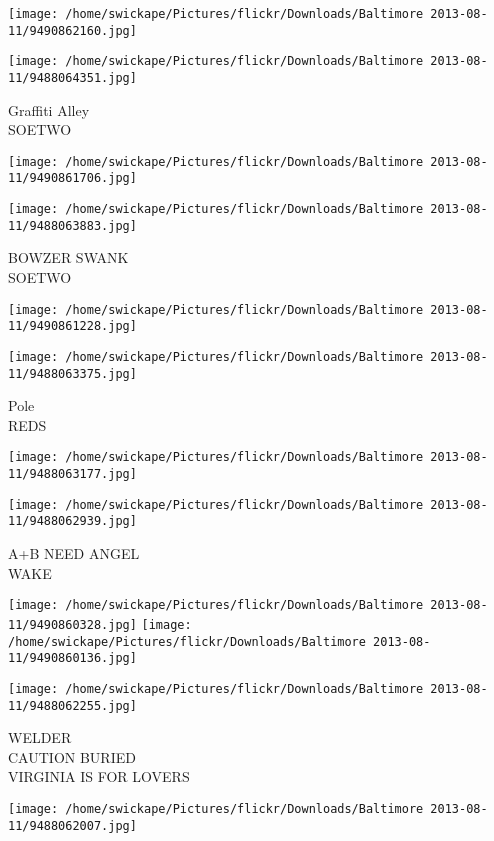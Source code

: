 \documentclass[10pt,letterpaper]{article}
\begin{document}
\texttt{[image: /home/swickape/Pictures/flickr/Downloads/Baltimore 2013-08-11/9490862160.jpg]}

\vspace{0.25in}
\texttt{[image: /home/swickape/Pictures/flickr/Downloads/Baltimore 2013-08-11/9488064351.jpg]}

Graffiti Alley\\
SOETWO
\pagebreak

\texttt{[image: /home/swickape/Pictures/flickr/Downloads/Baltimore 2013-08-11/9490861706.jpg]}

\vspace{0.25in}
\texttt{[image: /home/swickape/Pictures/flickr/Downloads/Baltimore 2013-08-11/9488063883.jpg]}

BOWZER SWANK\\
SOETWO
\pagebreak

\texttt{[image: /home/swickape/Pictures/flickr/Downloads/Baltimore 2013-08-11/9490861228.jpg]}

\vspace{0.25in}
\texttt{[image: /home/swickape/Pictures/flickr/Downloads/Baltimore 2013-08-11/9488063375.jpg]}

Pole\\
REDS
\pagebreak

\texttt{[image: /home/swickape/Pictures/flickr/Downloads/Baltimore 2013-08-11/9488063177.jpg]}

\vspace{0.25in}
\texttt{[image: /home/swickape/Pictures/flickr/Downloads/Baltimore 2013-08-11/9488062939.jpg]}

A+B NEED ANGEL\\
WAKE
\pagebreak

\texttt{[image: /home/swickape/Pictures/flickr/Downloads/Baltimore 2013-08-11/9490860328.jpg]}
\texttt{[image: /home/swickape/Pictures/flickr/Downloads/Baltimore 2013-08-11/9490860136.jpg]}

\texttt{[image: /home/swickape/Pictures/flickr/Downloads/Baltimore 2013-08-11/9488062255.jpg]}

WELDER\\
CAUTION BURIED\\
VIRGINIA IS FOR LOVERS
\pagebreak

\texttt{[image: /home/swickape/Pictures/flickr/Downloads/Baltimore 2013-08-11/9488062007.jpg]}
\end{document}
